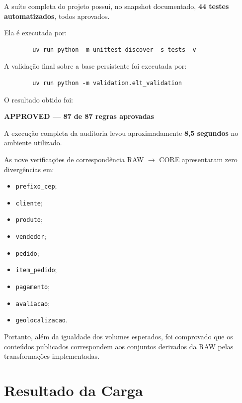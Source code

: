 \documentclass[12pt,a4paper]{article}
\begin{document}
	A suíte completa do projeto possui, no snapshot documentado,
	\textbf{44 testes automatizados}, todos aprovados.
	
	Ela é executada por:
	
	\begin{verbatim}
		uv run python -m unittest discover -s tests -v
	\end{verbatim}
	
	A validação final sobre a base persistente foi executada por:
	
	\begin{verbatim}
		uv run python -m validation.elt_validation
	\end{verbatim}
	
	O resultado obtido foi:
	
	\begin{center}
		\textbf{\textcolor{AzulCorporativo}{
				APPROVED --- 87 de 87 regras aprovadas
		}}
	\end{center}
	
	A execução completa da auditoria levou aproximadamente
	\textbf{8,5 segundos} no ambiente utilizado.
	
	As nove verificações de correspondência RAW $\rightarrow$ CORE apresentaram
	zero divergências em:
	
	\begin{itemize}[leftmargin=1.2cm]
		\item \texttt{prefixo\_cep};
		\item \texttt{cliente};
		\item \texttt{produto};
		\item \texttt{vendedor};
		\item \texttt{pedido};
		\item \texttt{item\_pedido};
		\item \texttt{pagamento};
		\item \texttt{avaliacao};
		\item \texttt{geolocalizacao}.
	\end{itemize}
	
	Portanto, além da igualdade dos volumes esperados, foi comprovado que os
	conteúdos publicados correspondem aos conjuntos derivados da RAW pelas
	transformações implementadas.
	
	\section{Resultado da Carga}
	
\end{document}
